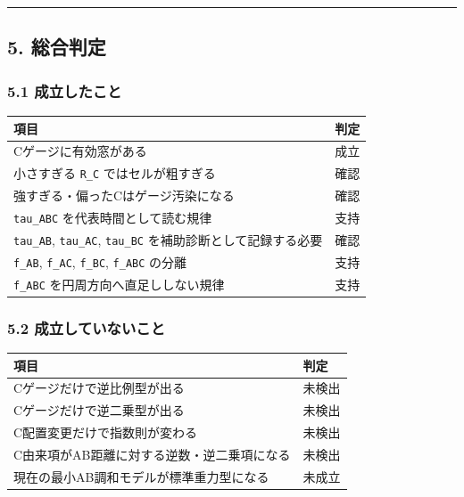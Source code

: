 \documentclass[
]{article}
\newcounter{none} %
\begin{document}
\begin{center}\rule{0.5\linewidth}{0.5pt}\end{center}

\subsection{5. 総合判定}\label{ux7dcfux5408ux5224ux5b9a}

\subsubsection{5.1
成立したこと}\label{ux6210ux7acbux3057ux305fux3053ux3068}

{\def\LTcaptype{none} %
\begin{longtable}[]{@{}ll@{}}
\toprule\noalign{}
項目 & 判定 \\
\midrule\noalign{}
\endhead
\bottomrule\noalign{}
\endlastfoot
Cゲージに有効窓がある & 成立 \\
小さすぎる \texttt{R\_C} ではセルが粗すぎる & 確認 \\
強すぎる・偏ったCはゲージ汚染になる & 確認 \\
\texttt{tau\_ABC} を代表時間として読む規律 & 支持 \\
\texttt{tau\_AB}, \texttt{tau\_AC}, \texttt{tau\_BC}
を補助診断として記録する必要 & 確認 \\
\texttt{f\_AB}, \texttt{f\_AC}, \texttt{f\_BC}, \texttt{f\_ABC} の分離 &
支持 \\
\texttt{f\_ABC} を円周方向へ直足ししない規律 & 支持 \\
\end{longtable}
}

\subsubsection{5.2
成立していないこと}\label{ux6210ux7acbux3057ux3066ux3044ux306aux3044ux3053ux3068}

{\def\LTcaptype{none} %
\begin{longtable}[]{@{}ll@{}}
\toprule\noalign{}
項目 & 判定 \\
\midrule\noalign{}
\endhead
\bottomrule\noalign{}
\endlastfoot
Cゲージだけで逆比例型が出る & 未検出 \\
Cゲージだけで逆二乗型が出る & 未検出 \\
C配置変更だけで指数則が変わる & 未検出 \\
C由来項がAB距離に対する逆数・逆二乗項になる & 未検出 \\
現在の最小AB調和モデルが標準重力型になる & 未成立 \\
\end{longtable}
}
\end{document}
